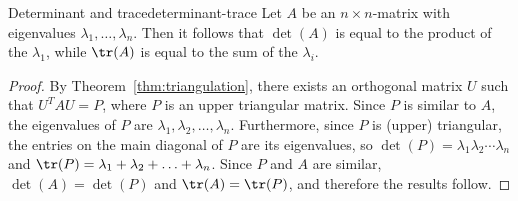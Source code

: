 \begin{corollary}{Determinant and trace}{determinant-trace}
Let $A$ be an $n \times n$-matrix with eigenvalues $\lambda_1,\ldots, \lambda_n$. Then it follows that $\det(A)$ is equal to the product of the $\lambda_1$, while $\tr(A)$ is equal to the sum of the $\lambda_i$.
\end{corollary}

\begin{proof}
By Theorem~\ref{thm:triangulation}, there exists an orthogonal matrix $U$ such
that $U^TAU=P$, where $P$ is an upper triangular matrix.
Since $P$ is similar to $A$, the eigenvalues
of $P$ are $\lambda_1, \lambda_2, \ldots, \lambda_n$.
Furthermore, since $P$ is (upper) triangular, the entries on the
main diagonal of $P$ are its eigenvalues, so
$\det(P)=\lambda_1 \lambda_2 \cdots \lambda_n$ and
$\tr(P)=\lambda_1 + \lambda_2 + \ldots + \lambda_n$.
Since $P$ and $A$ are similar, $\det(A)=\det(P)$ and $\tr(A)=\tr(P)$,
and therefore the results follow.
\end{proof}
